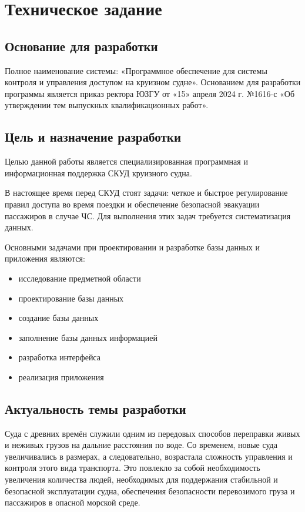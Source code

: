 \section{Техническое задание}
\subsection{Основание для разработки}

Полное наименование системы: «Программное обеспечение для системы контроля и управления доступом на круизном судне».
Основанием для разработки программы является приказ ректора ЮЗГУ от «15» апреля 2024 г. №1616-с «Об утверждении тем выпускных квалификационных работ».

\subsection{Цель и назначение разработки}

Целью данной работы является специализированная программная и информационная поддержка СКУД круизного судна.

В настоящее время перед СКУД стоят задачи: четкое и быстрое регулирование правил доступа во время поездки и обеспечение безопасной эвакуации пассажиров в случае ЧС. Для выполнения этих задач требуется систематизация данных. 

Основными задачами при проектировании и разработке базы данных  и приложения являются:
\begin{itemize}
	\item исследование предметной области
	\item проектирование базы данных
	\item создание базы данных
	\item заполнение базы данных информацией
	\item разработка  интерфейса
	\item реализация приложения
\end{itemize}

\subsection{Актуальность темы разработки}
Суда с древних времён служили одним из передовых способов переправки живых и неживых грузов на дальние расстояния по воде. Со временем, новые суда увеличивались в размерах, а следовательно, возрастала сложность управления и контроля этого вида транспорта. Это повлекло за собой необходимость увеличения количества людей, необходимых для поддержания стабильной и безопасной эксплуатации судна, обеспечения безопасности перевозимого груза и пассажиров в опасной морской среде.


